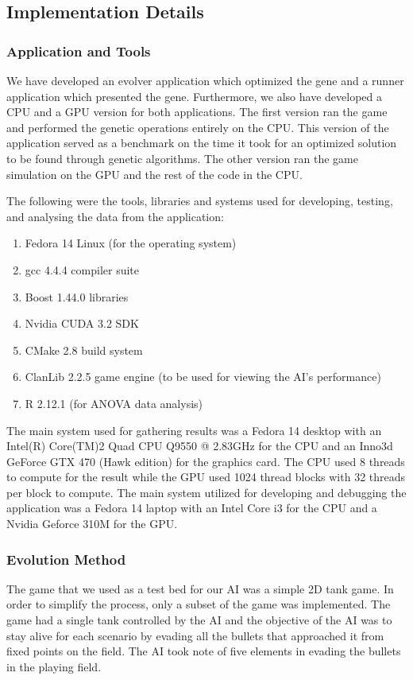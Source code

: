 \documentclass{acm_proc_article-sp}
\begin{document}
\subsection{Implementation Details}

\subsubsection{Application and Tools}
We have developed an evolver application which optimized the gene and a runner
application which presented the gene. Furthermore, we also have developed a CPU and
a GPU version for both applications. The first version ran the game and performed 
the genetic operations entirely on the CPU. This version of the application served 
as a benchmark on the time it took for an optimized solution to be found through 
genetic algorithms. The other version ran the game simulation on the GPU and 
the rest of the code in the CPU.


The following were the tools, libraries and systems used for developing, testing,
and analysing the data from the application:

\begin{enumerate}
  \item Fedora 14 Linux (for the operating system)
  \item gcc 4.4.4 compiler suite
  \item Boost 1.44.0 libraries
  \item Nvidia CUDA 3.2 SDK
  \item CMake 2.8 build system
  \item ClanLib 2.2.5 game engine (to be used for viewing the AI's performance)
  \item R 2.12.1 (for ANOVA data analysis)
\end{enumerate}

The main system used for gathering results was a Fedora 14 desktop with an 
Intel(R) Core(TM)2 Quad CPU Q9550 @ 2.83GHz for the CPU and an 
Inno3d GeForce GTX 470 (Hawk edition) for the graphics card. The CPU used 8
threads to compute for the result while the GPU used 1024 thread blocks with
32 threads per block to compute. The main system utilized for developing and 
debugging the application was a Fedora 14 laptop with an Intel Core i3 for 
the CPU and a Nvidia Geforce 310M for the GPU.


\subsubsection{Evolution Method}
The game that we used as a test bed for our AI was a simple 2D tank game.
In order to simplify the process, only a subset of the game was implemented.
The game had a single tank controlled by the AI and the objective of the AI
was to stay alive for each scenario by evading all the bullets that approached
it from fixed points on the field. The AI took note of five elements in evading the
bullets in the playing field.
\end{document}
